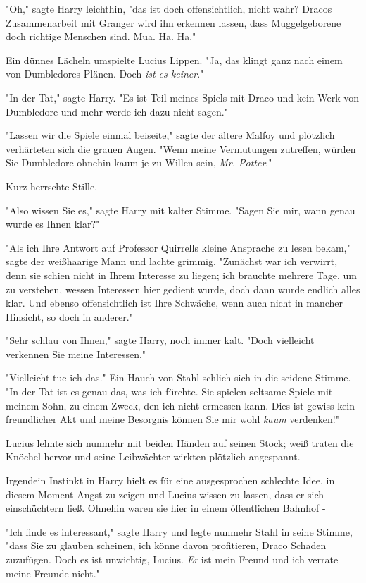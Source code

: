 {"Oh," sagte Harry leichthin, "das ist doch offensichtlich, nicht wahr? Dracos Zusammenarbeit mit Granger wird ihn erkennen lassen, dass Muggelgeborene doch richtige Menschen sind. Mua. Ha. Ha."

Ein dünnes Lächeln umspielte Lucius Lippen. "Ja, das klingt ganz nach einem von Dumbledores Plänen. Doch \emph{ist es keiner}."

"In der Tat," sagte Harry. "Es ist Teil meines Spiels mit Draco und kein Werk von Dumbledore und mehr werde ich dazu nicht sagen."

"Lassen wir die Spiele einmal beiseite," sagte der ältere Malfoy und plötzlich verhärteten sich die grauen Augen. "Wenn meine Vermutungen zutreffen, würden Sie Dumbledore ohnehin kaum je zu Willen sein, \emph{Mr. Potter}."

Kurz herrschte Stille.

"Also wissen Sie es," sagte Harry mit kalter Stimme. "Sagen Sie mir, wann genau wurde es Ihnen klar?"

"Als ich Ihre Antwort auf Professor Quirrells kleine Ansprache zu lesen bekam," sagte der weißhaarige Mann und lachte grimmig. "Zunächst war ich verwirrt, denn sie schien nicht in Ihrem Interesse zu liegen; ich brauchte mehrere Tage, um zu verstehen, wessen Interessen hier gedient wurde, doch dann wurde endlich alles klar. Und ebenso offensichtlich ist Ihre Schwäche, wenn auch nicht in mancher Hinsicht, so doch in anderer."

"Sehr schlau von Ihnen," sagte Harry, noch immer kalt. "Doch vielleicht verkennen Sie meine Interessen."

"Vielleicht tue ich das." Ein Hauch von Stahl schlich sich in die seidene Stimme. "In der Tat ist es genau das, was ich fürchte. Sie spielen seltsame Spiele mit meinem Sohn, zu einem Zweck, den ich nicht ermessen kann. Dies ist gewiss kein freundlicher Akt und meine Besorgnis können Sie mir wohl \emph{kaum} verdenken!"

Lucius lehnte sich nunmehr mit beiden Händen auf seinen Stock; weiß traten die Knöchel hervor und seine Leibwächter wirkten plötzlich angespannt.

Irgendein Instinkt in Harry hielt es für eine ausgesprochen schlechte Idee, in diesem Moment Angst zu zeigen und Lucius wissen zu lassen, dass er sich einschüchtern ließ. Ohnehin waren sie hier in einem öffentlichen Bahnhof -

"Ich finde es interessant," sagte Harry und legte nunmehr Stahl in seine Stimme, "dass Sie zu glauben scheinen, ich könne davon profitieren, Draco Schaden zuzufügen. Doch es ist unwichtig, Lucius. \emph{Er} ist mein Freund und ich verrate meine Freunde nicht."

}
